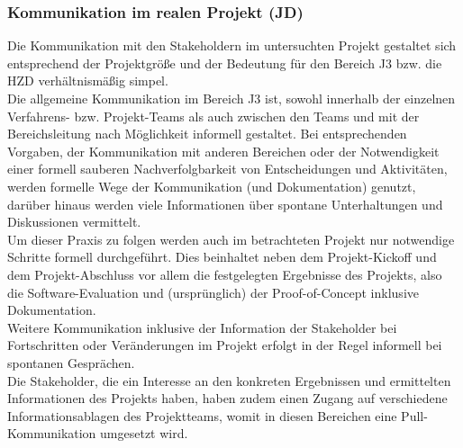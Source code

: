 \documentclass[ThesisDJ.tex]{subfiles}
\begin{document}
\subsubsection{Kommunikation im realen Projekt (JD)}
Die Kommunikation mit den Stakeholdern im untersuchten Projekt gestaltet sich entsprechend der Projektgröße und der Bedeutung für den Bereich J3 bzw. die HZD verhältnismäßig simpel.\\
Die allgemeine Kommunikation im Bereich J3 ist, sowohl innerhalb der einzelnen Verfahrens- bzw. Projekt-Teams als auch zwischen den Teams und mit der Bereichsleitung nach Möglichkeit informell gestaltet. Bei entsprechenden Vorgaben, der Kommunikation mit anderen Bereichen oder der Notwendigkeit einer formell sauberen Nachverfolgbarkeit von Entscheidungen und Aktivitäten, werden formelle Wege der Kommunikation (und Dokumentation) genutzt, darüber hinaus werden viele Informationen über spontane Unterhaltungen und Diskussionen vermittelt.\\
Um dieser Praxis zu folgen werden auch im betrachteten Projekt nur notwendige Schritte formell durchgeführt. Dies beinhaltet neben dem Projekt-Kickoff und dem Projekt-Abschluss vor allem die festgelegten Ergebnisse des Projekts, also die Software-Evaluation und (ursprünglich) der Proof-of-Concept inklusive Dokumentation.\\
Weitere Kommunikation inklusive der Information der Stakeholder bei Fortschritten oder Veränderungen im Projekt erfolgt in der Regel informell bei spontanen Gesprächen.\\
Die Stakeholder, die ein Interesse an den konkreten Ergebnissen und ermittelten Informationen des Projekts haben, haben zudem einen Zugang auf verschiedene Informationsablagen des Projektteams, womit in diesen Bereichen eine Pull-Kommunikation umgesetzt wird.
\end{document}
